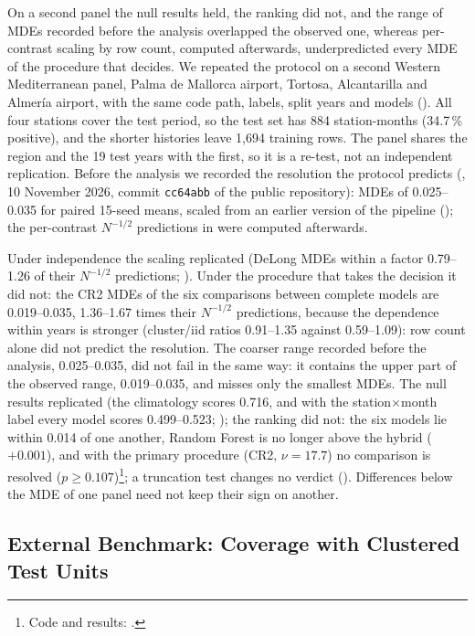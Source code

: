 \documentclass[11pt,a4paper]{article}
\begin{document}
On a second panel the null results held, the ranking did not, and the range of MDEs recorded before the analysis overlapped the observed one, whereas per-contrast scaling by row count, computed afterwards, underpredicted every MDE of the procedure that decides. We repeated the protocol on a second Western Mediterranean panel, Palma de Mallorca airport, Tortosa, Alcantarilla and Almería airport, with the same code path, labels, split years and models (). All four stations cover the test period, so the test set has 884 station-months (34.7\,\% positive), and the shorter histories leave 1{,}694 training rows. The panel shares the region and the 19 test years with the first, so it is a re-test, not an independent replication. Before the analysis we recorded the resolution the protocol predicts (, 10 November 2026, commit \texttt{cc64abb} of the public repository): MDEs of 0.025--0.035 for paired 15-seed means, scaled from an earlier version of the pipeline (); the per-contrast $N^{-1/2}$ predictions in  were computed afterwards.

Under independence the scaling replicated (DeLong MDEs within a factor 0.79--1.26 of their $N^{-1/2}$ predictions; ). Under the procedure that takes the decision it did not: the CR2 MDEs of the six comparisons between complete models are 0.019--0.035, 1.36--1.67 times their $N^{-1/2}$ predictions, because the dependence within years is stronger (cluster/iid ratios 0.91--1.35 against 0.59--1.09): row count alone did not predict the resolution. The coarser range recorded before the analysis, 0.025--0.035, did not fail in the same way: it contains the upper part of the observed range, 0.019--0.035, and misses only the smallest MDEs. The null results replicated (the climatology scores 0.716, and with the station$\times$month label every model scores 0.499--0.523; ); the ranking did not: the six models lie within 0.014 of one another, Random Forest is no longer above the hybrid ($+0.001$), and with the primary procedure (CR2, $\nu=17.7$) no comparison is resolved ($p\ge0.107$)\footnote{Code and results: .}; a truncation test changes no verdict (). Differences below the MDE of one panel need not keep their sign on another.

\subsection{External Benchmark: Coverage with Clustered Test Units}
\label{sec:external}
\end{document}
